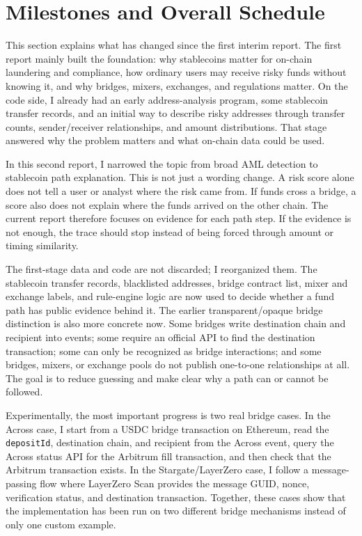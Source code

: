 \documentclass[12pt,a4paper]{article}
\begin{document}
\section{Milestones and Overall Schedule}

This section explains what has changed since the first interim report. The first report mainly built the foundation: why stablecoins matter for on-chain laundering and compliance, how ordinary users may receive risky funds without knowing it, and why bridges, mixers, exchanges, and regulations matter. On the code side, I already had an early address-analysis program, some stablecoin transfer records, and an initial way to describe risky addresses through transfer counts, sender/receiver relationships, and amount distributions. That stage answered why the problem matters and what on-chain data could be used.

In this second report, I narrowed the topic from broad AML detection to stablecoin path explanation. This is not just a wording change. A risk score alone does not tell a user or analyst where the risk came from. If funds cross a bridge, a score also does not explain where the funds arrived on the other chain. The current report therefore focuses on evidence for each path step. If the evidence is not enough, the trace should stop instead of being forced through amount or timing similarity.

The first-stage data and code are not discarded; I reorganized them. The stablecoin transfer records, blacklisted addresses, bridge contract list, mixer and exchange labels, and rule-engine logic are now used to decide whether a fund path has public evidence behind it. The earlier transparent/opaque bridge distinction is also more concrete now. Some bridges write destination chain and recipient into events; some require an official API to find the destination transaction; some can only be recognized as bridge interactions; and some bridges, mixers, or exchange pools do not publish one-to-one relationships at all. The goal is to reduce guessing and make clear why a path can or cannot be followed.

Experimentally, the most important progress is two real bridge cases. In the Across case, I start from a USDC bridge transaction on Ethereum, read the \texttt{depositId}, destination chain, and recipient from the Across event, query the Across status API for the Arbitrum fill transaction, and then check that the Arbitrum transaction exists. In the Stargate/LayerZero case, I follow a message-passing flow where LayerZero Scan provides the message GUID, nonce, verification status, and destination transaction. Together, these cases show that the implementation has been run on two different bridge mechanisms instead of only one custom example.
\end{document}
